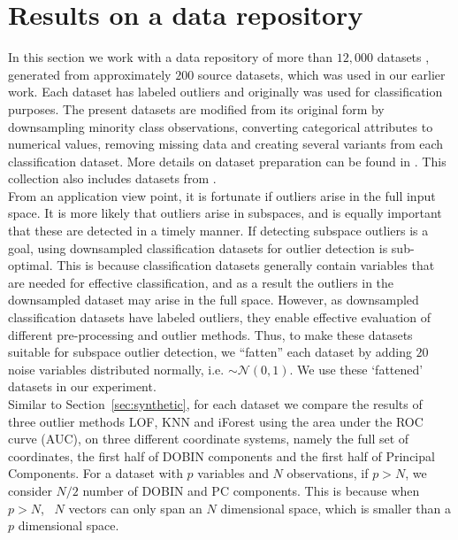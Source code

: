 \documentclass[11pt]{article}
\begin{document}
\section{Results on a data repository}\label{sec:DatRepo}
In this section we work with a data repository of more than $12,000$ datasets \citep{datasets}, generated from approximately $200$ source datasets, which was used in our earlier work. Each dataset has labeled outliers and  originally was used for classification purposes. The present datasets are modified from its original form by downsampling minority class observations, converting categorical attributes to numerical values, removing missing data and creating several variants from each classification dataset. More details on dataset preparation can be found in \cite{kandanaarachchi2018normalization}. This collection also includes datasets from \cite{campos2016evaluation}. \\

From an application view point, it is fortunate if outliers arise in the full input space. It is more likely that outliers arise in subspaces, and is equally important that these are detected in a timely manner. If detecting subspace outliers is a goal, using downsampled classification datasets for outlier detection is sub-optimal. This is  because classification datasets generally contain variables that are needed for effective classification, and as a result the  outliers in the downsampled dataset may arise in the full space. However, as downsampled classification datasets have labeled outliers, they enable effective evaluation of different pre-processing and outlier methods. Thus, to make these datasets suitable for subspace outlier detection, we ``fatten'' each dataset by adding  $20$ noise variables distributed normally, i.e. $\sim \mathcal{N}(0,1)$.  We use  these `fattened' datasets in our experiment.  \\


Similar to Section~\ref{sec:synthetic}, for each dataset we compare the results of three outlier methods LOF, KNN and iForest using the area under the ROC curve (AUC), on three different coordinate systems, namely the full set of coordinates, the first half of DOBIN components and the first half of Principal Components. For a dataset with $p$ variables and $N$ observations, if $p > N$, we consider $N/2$ number of DOBIN and PC components. This is because when $p >N$, \,  $N$  vectors can only span an $N$ dimensional space, which is smaller than a $p$ dimensional space. \\ %
\end{document}

